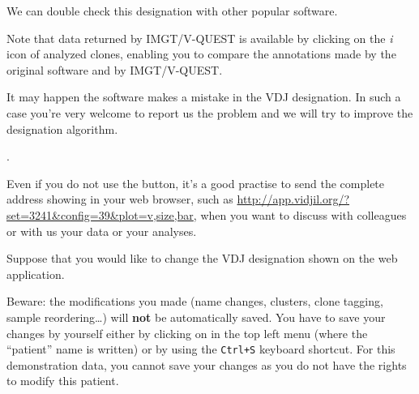 \documentclass[10pt]{article}
\begin{document}
We can double check this designation with other popular software.
  
Note that data returned by IMGT/V-QUEST is available by clicking on the \textit{i} icon of analyzed clones,
enabling you to compare the annotations made by the original software and by IMGT/V-QUEST. 


\bigskip

It may happen the software makes a mistake in the VDJ designation.
In such a case you're very welcome to report us the problem
and we will try to improve the designation algorithm.

.

Even if you do not use the  button, it's a good practise
to send the complete address showing in your web browser, such
as  \url{http://app.vidjil.org/?set=3241&config=39&plot=v,size,bar},
when you want to discuss with colleagues or with us your data or your analyses.

\bigskip

Suppose that you would like to change the VDJ designation shown on the web application.

Beware: the modifications you made (name changes, clusters, clone
tagging, sample reordering\dots) will \textbf{not} be automatically saved. You have to save
your changes by yourself either by clicking on  in the top left menu (where the
``patient'' name is written) or by using the \texttt{Ctrl+S} keyboard
shortcut.
For this demonstration data, you cannot save your changes as you do not have
the rights to modify this patient.
\end{document}
